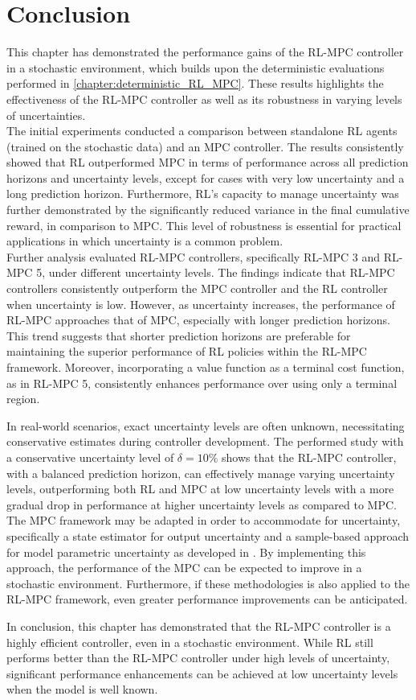 \section{Conclusion}

This chapter has demonstrated the performance gains of the RL-MPC controller in a stochastic environment, which builds upon the deterministic evaluations performed in \autoref{chapter:deterministic_RL_MPC}. These results highlights the effectiveness of the RL-MPC controller as well as its robustness in varying levels of uncertainties.\\
The initial experiments conducted a comparison between standalone RL agents (trained on the stochastic data) and an MPC controller. The results consistently showed that RL outperformed MPC in terms of performance across all prediction horizons and uncertainty levels, except for cases with very low uncertainty and a long prediction horizon. Furthermore, RL's capacity to manage uncertainty was further demonstrated by the significantly reduced variance in the final cumulative reward, in comparison to MPC. This level of robustness is essential for practical applications in which uncertainty is a common problem.\\
Further analysis evaluated RL-MPC controllers, specifically RL-MPC 3 and RL-MPC 5, under different uncertainty levels. The findings indicate that RL-MPC controllers consistently outperform the MPC controller and the RL controller when uncertainty is low. However, as uncertainty increases, the performance of RL-MPC approaches that of MPC, especially with longer prediction horizons. This trend suggests that shorter prediction horizons are preferable for maintaining the superior performance of RL policies within the RL-MPC framework. Moreover, incorporating a value function as a terminal cost function, as in RL-MPC 5, consistently enhances performance over using only a terminal region.

In real-world scenarios, exact uncertainty levels are often unknown, necessitating conservative estimates during controller development. The performed study with a conservative uncertainty level of $\delta = 10\%$ shows that the  RL-MPC controller, with a balanced prediction horizon, can effectively manage varying uncertainty levels, outperforming both RL and MPC at low uncertainty levels with a more gradual drop in performance at higher uncertainty levels as compared to MPC. The MPC framework may be adapted in order to accommodate for uncertainty, specifically a state estimator for output uncertainty and a sample-based approach for model parametric uncertainty  as developed in \cite{boersmaRobustSamplebasedModel2022}. By implementing this approach, the performance of the MPC can be expected to improve in a stochastic environment. Furthermore, if these methodologies is also applied to the RL-MPC framework, even greater performance improvements can be anticipated.

In conclusion, this chapter has demonstrated that the RL-MPC controller is a highly efficient controller, even in a stochastic environment. While RL still performs better than the RL-MPC controller under high levels of uncertainty, significant performance enhancements can be achieved at low uncertainty levels when the model is well known.
